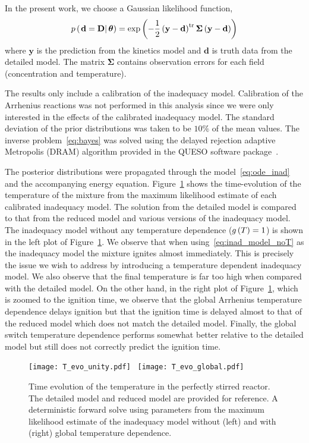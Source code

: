 \documentclass[fontsize=12pt, %
               paper=a4, %
               hyperref]{report}
\begin{document}
  In the present work, we choose a Gaussian likelihood function, 
  \begin{align}
    p\left(\left.\mathbf{d} = \mathbf{D}\right|\boldsymbol{\theta}\right) = 
    \exp\left(-\frac{1}{2}\left(\mathbf{y} - \mathbf{d}\right)^{\mathrm{tr}}\boldsymbol{\Sigma}\left(\mathbf{y} - \mathbf{d}\right)\right) 
    \label{eq:lhood}
  \end{align}
  where $\mathbf{y}$ is the prediction from the kinetics model and $\mathbf{d}$ is 
  truth data from the detailed model.  The matrix $\boldsymbol{\Sigma}$ contains 
  observation errors for each field (concentration and temperature).  
  
  The results only include a calibration of 
  the inadequacy model.  Calibration of the Arrhenius reactions was not performed in 
  this analysis since we were only interested in the effects of the calibrated 
  inadequacy model.  The standard deviation of the prior distributions was taken to be 
  $10\%$ of the mean values.  The inverse problem~\eqref{eq:bayes} was solved using the 
  delayed rejection adaptive Metropolis (DRAM) algorithm provided in the QUESO software 
  package~\cite{mcdougall2015parallel, estacio2016queso}.

  The posterior distributions were propagated through the model~\eqref{eq:ode_inad} and 
  the accompanying energy equation.  Figure~\ref{fig:T_evo} shows the time-evolution of 
  the temperature of the mixture from the maximum likelihood estimate of each calibrated 
  inadequacy model.  The solution from the detailed model is compared to that from the 
  reduced model and various versions of the inadequacy model.  The inadequacy model without 
  any temperature dependence ($g\left(T\right) = 1$) is shown in the left plot of Figure~\ref{fig:T_evo}.  
  We observe that when using~\eqref{eq:inad_model_noT} as the inadequacy model the mixture 
  ignites almost immediately.  This is precisely the issue we wish to address by introducing a 
  temperature dependent inadequacy model.  We also observe that the final temperature is far too 
  high when compared with the detailed model.  On the other hand, in the right plot of 
  Figure~\ref{fig:T_evo}, which is zoomed to the ignition time, we observe that the global 
  Arrhenius temperature dependence delays ignition but that the ignition time is delayed almost 
  to that of the reduced model which does not match the detailed model.  Finally, the global 
  switch temperature dependence performs somewhat better relative to the detailed model but still 
  does not correctly predict the ignition time.
  \begin{figure}[h!]
    \begin{center}
      \texttt{[image: T\_evo\_unity.pdf]}~
      \texttt{[image: T\_evo\_global.pdf]}
    \end{center}
    \caption{Time evolution of the temperature in the perfectly stirred reactor. 
             The detailed model and reduced model are provided for reference.  
             A deterministic forward solve using parameters from the maximum 
             likelihood estimate of the inadequacy model without (left) and 
             with (right) global temperature dependence.}
    \label{fig:T_evo}
  \end{figure}
  
\end{document}
